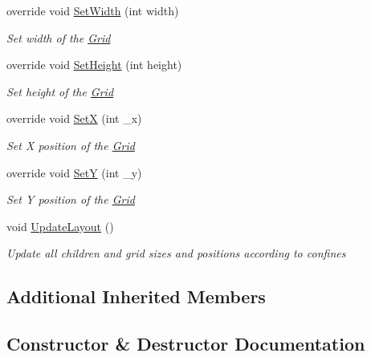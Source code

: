 \begin{DoxyCompactItemize}
override void \mbox{\hyperlink{class_space_v_i_l_1_1_grid_a2d3ce59b92ad9ca3bba2fb69feb549cb}{Set\+Width}} (int width)
\begin{DoxyCompactList}\small\item\em Set width of the \mbox{\hyperlink{class_space_v_i_l_1_1_grid}{Grid}} \end{DoxyCompactList}\item 
override void \mbox{\hyperlink{class_space_v_i_l_1_1_grid_a64c7b1987fb8823330dbeaea7420369c}{Set\+Height}} (int height)
\begin{DoxyCompactList}\small\item\em Set height of the \mbox{\hyperlink{class_space_v_i_l_1_1_grid}{Grid}} \end{DoxyCompactList}\item 
override void \mbox{\hyperlink{class_space_v_i_l_1_1_grid_a28b973b0fddabf73166c9a24946e2e59}{SetX}} (int \+\_\+x)
\begin{DoxyCompactList}\small\item\em Set X position of the \mbox{\hyperlink{class_space_v_i_l_1_1_grid}{Grid}} \end{DoxyCompactList}\item 
override void \mbox{\hyperlink{class_space_v_i_l_1_1_grid_a37ea23fcafda8c5fd8cc8fc41101a20d}{SetY}} (int \+\_\+y)
\begin{DoxyCompactList}\small\item\em Set Y position of the \mbox{\hyperlink{class_space_v_i_l_1_1_grid}{Grid}} \end{DoxyCompactList}\item 
void \mbox{\hyperlink{class_space_v_i_l_1_1_grid_a3cc929016738df7ef25e984338255a55}{Update\+Layout}} ()
\begin{DoxyCompactList}\small\item\em Update all children and grid sizes and positions according to confines \end{DoxyCompactList}\end{DoxyCompactItemize}
\subsection*{Additional Inherited Members}


\subsection{Constructor \& Destructor Documentation}
\mbox{\label{class_space_v_i_l_1_1_grid_a43f2e279b402d3f37abaf7407cb10359}} 
